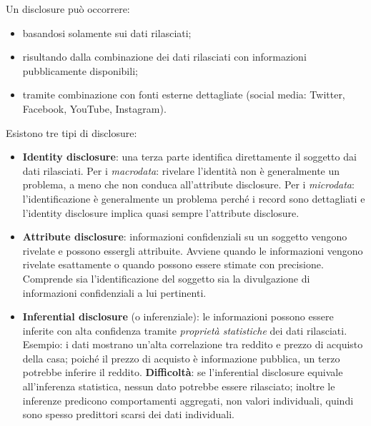 \documentclass[a4paper,11pt]{article}
\begin{document}
\begin{definizione}[Disclosure]
Un disclosure pu\`{o} occorrere:
\begin{itemize}
  \item basandosi solamente sui dati rilasciati;
  \item risultando dalla combinazione dei dati rilasciati con informazioni pubblicamente disponibili;
  \item tramite combinazione con fonti esterne dettagliate (social media: Twitter, Facebook, YouTube, Instagram).
\end{itemize}
Esistono tre tipi di disclosure:
\begin{itemize}
  \item \textbf{Identity disclosure}: una terza parte identifica direttamente il soggetto dai dati rilasciati. Per i \emph{macrodata}: rivelare l'identit\`{a} non \`{e} generalmente un problema, a meno che non conduca all'attribute disclosure. Per i \emph{microdata}: l'identificazione \`{e} generalmente un problema perch\'{e} i record sono dettagliati e l'identity disclosure implica quasi sempre l'attribute disclosure.
  \item \textbf{Attribute disclosure}: informazioni confidenziali su un soggetto vengono rivelate e possono essergli attribuite. Avviene quando le informazioni vengono rivelate esattamente o quando possono essere stimate con precisione. Comprende sia l'identificazione del soggetto sia la divulgazione di informazioni confidenziali a lui pertinenti.
  \item \textbf{Inferential disclosure} (o inferenziale): le informazioni possono essere inferite con alta confidenza tramite \emph{propriet\`{a} statistiche} dei dati rilasciati. Esempio: i dati mostrano un'alta correlazione tra reddito e prezzo di acquisto della casa; poich\'{e} il prezzo di acquisto \`{e} informazione pubblica, un terzo potrebbe inferire il reddito. \textbf{Difficolt\`{a}}: se l'inferential disclosure equivale all'inferenza statistica, nessun dato potrebbe essere rilasciato; inoltre le inferenze predicono comportamenti aggregati, non valori individuali, quindi sono spesso predittori scarsi dei dati individuali.
\end{itemize}
\end{definizione}
\end{document}

